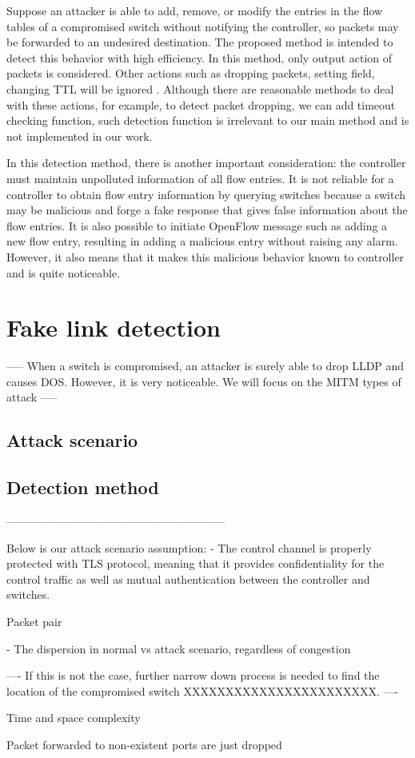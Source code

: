 Suppose an attacker is able to add, remove, or modify the entries in the flow tables of a compromised
switch without notifying the controller, so packets may be forwarded to an undesired destination. The proposed method is intended to detect this behavior with high efficiency. In this method, only output action of packets is considered. Other actions such as dropping packets, setting field, changing TTL will be ignored \sout{}. Although there are reasonable methods to deal with these actions, for example, to detect packet dropping, we can add timeout checking function, such detection function is irrelevant to our main method and is not implemented in our work.

In this detection method, there is another important consideration: the controller must maintain unpolluted information of all flow entries. It is not reliable for a controller to obtain flow entry information by querying switches because a switch may be malicious and forge a fake response that gives false information about the flow entries. It is also possible to initiate OpenFlow message such as adding a new flow entry, resulting in adding a malicious entry without raising any alarm. However, it also means that it makes this malicious behavior known to controller and is quite noticeable.

\section{Fake link detection}

-----
When a switch is compromised, an attacker is surely able to drop LLDP and causes DOS. However, it is very noticeable. We will focus on the MITM types of attack
-----
\subsection{Attack scenario}
\subsection{Detection method}


-----------------------------------------------------------

Below is our attack scenario assumption: 
- The control channel is properly protected with TLS protocol, meaning
that it provides confidentiality for the control traffic as well as mutual
authentication between the controller and switches.

Packet pair

- The dispersion in normal vs attack scenario, regardless of congestion

----
If this is not the case, further narrow down process is needed to find the location of the compromised switch XXXXXXXXXXXXXXXXXXXXXXX.
----

Time and space complexity


Packet forwarded to non-existent ports are just dropped

